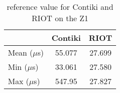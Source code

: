 \begin{table}[!ht]
  \centering
  \begin{tabular}{l|c|c}
                & Contiki & RIOT \\ \hline
  Mean ($\mu$s) & 55.077   & 27.699 \\
  Min  ($\mu$s) & 33.061 & 27.580 \\
  Max  ($\mu$s) & 547.95   & 27.827
  \end{tabular}
  \caption{reference value for Contiki and RIOT on the Z1}
  \label{tab:reference-value-z1}
  \end{table}